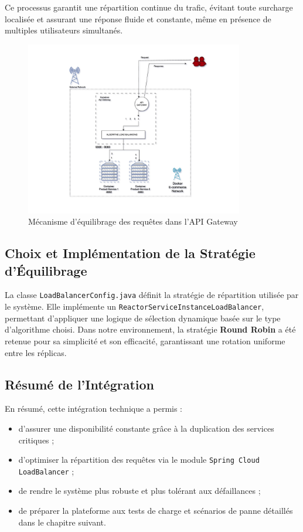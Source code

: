 Ce processus garantit une répartition continue du trafic, évitant toute surcharge localisée et assurant une réponse fluide et constante, même en présence de multiples utilisateurs simultanés.

\begin{figure}[H]
    \centering
    \includegraphics[width=0.85\textwidth]{images/lb-ex.jpeg}
    \caption{Mécanisme d'équilibrage des requêtes dans l'API Gateway}
    \label{fig:loadbalancer-flow}
\end{figure}

\subsection{Choix et Implémentation de la Stratégie d'Équilibrage}
La classe \texttt{LoadBalancerConfig.java} définit la stratégie de répartition utilisée par le système.  
Elle implémente un \texttt{ReactorServiceInstanceLoadBalancer}, permettant d'appliquer une logique de sélection dynamique basée sur le type d'algorithme choisi.  
Dans notre environnement, la stratégie \textbf{Round Robin} a été retenue pour sa simplicité et son efficacité, garantissant une rotation uniforme entre les réplicas.

\subsection{Résumé de l'Intégration}
En résumé, cette intégration technique a permis :
\begin{itemize}
    \item d'assurer une disponibilité constante grâce à la duplication des services critiques ;
    \item d'optimiser la répartition des requêtes via le module \texttt{Spring Cloud LoadBalancer} ;
    \item de rendre le système plus robuste et plus tolérant aux défaillances ;
    \item de préparer la plateforme aux tests de charge et scénarios de panne détaillés dans le chapitre suivant.
\end{itemize}



